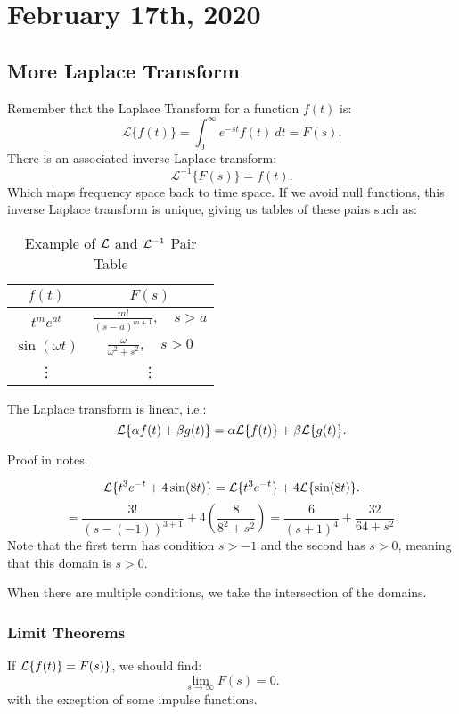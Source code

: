 \documentclass[../main/main.tex]{subfiles}
\begin{document}
\section{February 17th, 2020}
\subsection{More Laplace Transform}
Remember that the Laplace Transform for a function $f(t)$ is:
\[
	\mathcal{L}\{f(t)\} = \int^\infty_0 e^{-st}f(t)~dt = F(s)
.\] There is an associated inverse Laplace transform: \[
\mathcal{L}^{-1}\{F(s)\} = f(t)
.\] Which maps frequency space back to time space. If we avoid null functions, this inverse Laplace transform is unique, giving us tables of these pairs such as: 
\begin{table}[htpb]
	\centering
	\caption{Example of $\mathcal{L}$ and $\mathcal{L}^{-1}$ Pair Table}
	\label{tab:label}
	\begin{tabular}{c|c}
		$f(t)$ & $F(s)$\\\hline
		$t ^{m}e^{at}$ & $\frac{m!}{(s-a)^{m+1}},\quad s>a$\\
		$\sin(\omega t)$ & $\frac{\omega}{\omega^2+s^2},\quad s>0$\\
		\vdots& \vdots
	\end{tabular}
\end{table}
\begin{theorem} 
The Laplace transform is linear, i.e.: \[
	\mathcal{L}\{\alpha f(t) + \beta g(t)\} = \alpha\mathcal{L}\{f(t)\} + \beta\mathcal{L}\{g(t)\}
.\] 
\end{theorem}
\begin{remark}
	Proof in notes.
\end{remark}
\begin{example}
	 \[
		 \mathcal{L}\{t ^{3}e^{-t}+4\sin(8t)\} = \mathcal{L}\{t ^{3}e^{-t}\}+4\mathcal{L}\{\sin(8t)\} 
	.\] \[
	=\frac{3!}{(s-(-1))^{3+1}}+4\left( \frac{8}{8^2+s^2} \right) = \frac{6}{(s+1)^4}+\frac{32}{64+s^2}
.\] Note that the first term has condition $s>-1$ and the second has $s>0$, meaning that this domain is $s>0$.
\end{example}
\begin{remark}
	When there are multiple conditions, we take the intersection of the domains.
\end{remark}
\subsubsection{Limit Theorems}
\begin{theorem}
If $\mathcal{L}\{f(t)\}=F(s)\}$, we should find:  \[
		\lim\limits_{s \to \infty} F(s)=0
	.\] with the exception of some impulse functions.
\end{theorem}
\end{document}
